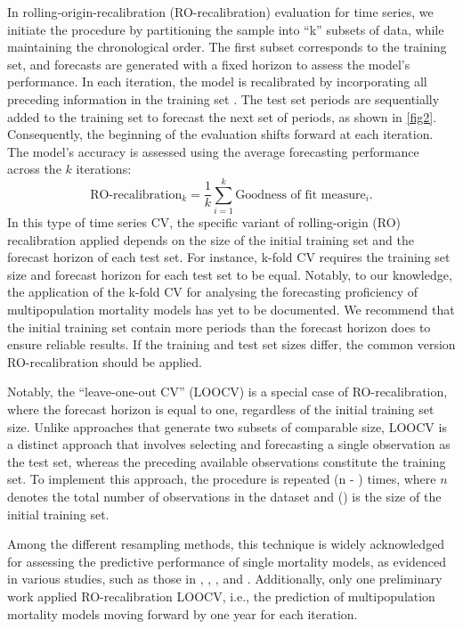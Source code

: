 In rolling-origin-recalibration (RO-recalibration) evaluation for time series, we initiate the procedure by partitioning the sample into ``k'' subsets of data, while maintaining the chronological order. The first subset corresponds to the training set, and forecasts are generated with a fixed horizon to assess the model's performance. In each iteration, the model is recalibrated by incorporating all preceding information in the training set \citep{Armstrong1972, Tashman2000, Berg2012, Hyndman2021}. The test set periods are sequentially added to the training set to forecast the next set of periods, as shown in \autoref{fig2}. Consequently, the beginning of the evaluation shifts forward at each iteration. The model's accuracy is assessed using the average forecasting performance across the $k$ iterations:
\begin{equation}
\textrm{RO-recalibration}_k = \frac{1}{k}\sum^k_{i=1} \textrm{Goodness of fit measure}_i.
\label{Eq.KFold}
\end{equation}
In this type of time series CV, the specific variant of rolling-origin (RO) recalibration applied depends on the size of the initial training set and the forecast horizon of each test set. For instance, k-fold CV \citep{Hastie2009, James2013, Bergmeir2018} requires the training set size and forecast horizon for each test set to be equal. Notably, to our knowledge, the application of the k-fold CV for analysing the forecasting proficiency of multipopulation mortality models has yet to be documented. We recommend that the initial training set contain more periods than the forecast horizon does to ensure reliable results. If the training and test set sizes differ, the common version RO-recalibration should be applied.

Notably, the ``leave-one-out CV'' (LOOCV) \citep{Bur1989, Shao1993} is a special case of RO-recalibration, where the forecast horizon is equal to one, regardless of the initial training set size. Unlike approaches that generate two subsets of comparable size, LOOCV {is} a distinct approach that involves selecting and forecasting a single observation as the test set, whereas the preceding available observations constitute the training set. {To implement this approach, the procedure is repeated (n - ) times, where \(n\) denotes the total number of observations in the dataset and () is the size of the initial training set.}

Among the different resampling methods, this technique is widely acknowledged for assessing the predictive performance of single mortality models, as evidenced in various studies, such as those in \citet{Li2019}, \citet{Atance2020}, \citet{Barigou2023}, and \citet{Atance2024}. Additionally, only one preliminary work \citet{risk2022} applied RO-recalibration LOOCV, i.e., the prediction of multipopulation mortality models moving forward by one year for each iteration.

